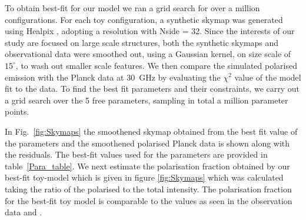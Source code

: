 \documentclass[12pt, a4 paper]{article}
\begin{document}
To obtain best-fit for our model we ran a grid search for over a million configurations. For each toy configuration, a synthetic skymap was generated using Healpix \cite{Healpix_2005}, adopting a resolution with Nside = 32. Since the interests of our study are focused on large scale structures, both the synthetic skymaps and observational data were smoothed out, using a Gaussian kernel, on size scale of $15^{\circ}$, to wash out smaller scale features. We then compare the simulated polarised emission with the Planck data at 30~GHz by evaluating the $\chi^{2}$ value of the model fit to the data. To find the best fit parameters and their constraints, we carry out a grid search over the 5 free parameters, sampling in total a million parameter points.%


In Fig.~\ref{fig:Skymaps} the smoothened skymap obtained from the best fit value of the parameters and the smoothened polarised Planck data is shown along with the residuals. The best-fit values used for the parameters are provided in table~\ref{Para_table}. 
We next estimate the polarisation fraction obtained by our best-fit toy-model which is given in figure \ref{fig:Skymaps} which was calculated taking the ratio of the polarised to the total intensity. The polarisation fraction for the best-fit toy model is comparable to the values as seen in the observation data \cite{Carretti_2013} and \cite{WMAP_Page}.
\end{document}
